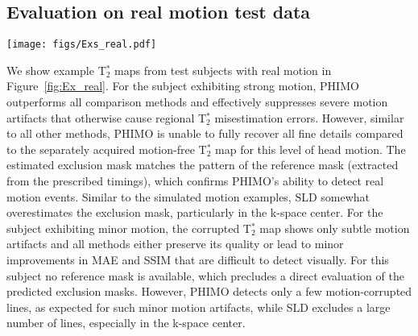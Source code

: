 \documentclass[AMA,STIX2COL]{MRM}
\newcommand{\tstar}[1]{{T$_2^*$}}
\begin{document}
\subsection{Evaluation on real motion test data}  \label{sec:results:real}
%
\begin{figure*}
\centerline{\texttt{[image: figs/Exs\_real.pdf]}}
\caption{\ Qualitative examples for test data with real motion. The resulting \tstar{} map from PHIMO is compared to the uncorrected data (left), ORBA, SLD, HR/QR, and the separately acquired motion-free data (right).
We additionally provide the corresponding exclusion masks and the reference mask (if available).
The top row (A) shows one subject with minor motion (no instructions on timing given) and the bottom row (B) one subject with strong motion (motion timing experiment). 
Green arrows indicate severe motion artifacts that are suppressed by PHIMO and partially by HR/QR, blue arrows indicate missing details for all methods.
MAE (in ms) and SSIM values for the visualized slices relative to the motion-free \tstar{} map are provided below each plot.}\label{fig:Ex_real}
\end{figure*}
%
We show example \tstar{} maps from test subjects with real motion in Figure~\ref{fig:Ex_real}.
For the subject exhibiting strong motion, PHIMO outperforms all comparison methods and effectively suppresses severe motion artifacts that otherwise cause regional \tstar{} misestimation errors. However, similar to all other methods, PHIMO is unable to fully recover all fine details compared to the separately acquired motion-free \tstar{} map for this level of head motion. The estimated exclusion mask matches the pattern of the reference mask (extracted from the prescribed timings), which confirms PHIMO's ability to detect real motion events. Similar to the simulated motion examples, SLD somewhat overestimates the exclusion mask, particularly in the k-space center.
For the subject exhibiting minor motion, the corrupted \tstar{} map shows only subtle motion artifacts and all methods either preserve its quality or lead to minor improvements in MAE and SSIM that are difficult to detect visually.
For this subject no reference mask is available, which precludes a direct evaluation of the predicted exclusion masks. However, PHIMO detects only a few motion-corrupted lines, as expected for such minor motion artifacts, while SLD excludes a large number of lines, especially in the k-space center. 
\end{document}
